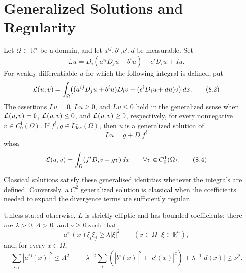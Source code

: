 \chapter{Generalized Solutions and Regularity}

\begin{definition}
\label{gt-def-8-divergence-form-generalized-solution}
Let $\Omega\subset\mathbb R^n$ be a domain, and let $a^{ij},b^i,c^i,d$ be
measurable. Set
\begin{equation}
Lu=D_i(a^{ij}D_j u+b^iu)+c^iD_i u+du.
\tag{8.1}
\end{equation}
For weakly differentiable $u$ for which the following integral is defined, put
\begin{equation}
\mathcal{L}(u,v)=\int_\Omega\bigl((a^{ij}D_j u+b^iu)D_i v
 -(c^iD_i u+du)v\bigr)\,dx.
\tag{8.2}
\end{equation}
The assertions $Lu=0$, $Lu\geq0$, and $Lu\leq0$ hold in the generalized sense
when $\mathcal{L}(u,v)=0$, $\mathcal{L}(u,v)\leq0$, and $\mathcal{L}(u,v)\geq0$, respectively, for
every nonnegative $v\in C_0^1(\Omega)$. If $f^i,g\in L^1_{\mathrm{loc}}(\Omega)$,
then $u$ is a generalized solution of
\begin{equation}
Lu=g+D_if^i
\tag{8.3}
\end{equation}
when
\begin{equation}
\mathcal{L}(u,v)=\int_\Omega(f^iD_iv-gv)\,dx
\qquad\forall v\in C_0^1(\Omega).
\tag{8.4}
\end{equation}
\end{definition}

\begin{remark}
\label{gt-rem-8-classical-generalized-equivalence}
Classical solutions satisfy these generalized identities whenever the integrals
are defined. Conversely, a $C^2$ generalized solution is classical when the
coefficients needed to expand the divergence terms are sufficiently regular.
\end{remark}

\begin{convention}
\label{gt-conv-8-ellipticity-coefficient-bounds}
Unless stated otherwise, $L$ is strictly elliptic and has bounded coefficients:
there are $\lambda>0$, $\Lambda>0$, and $\nu\geq0$ such that
\begin{equation}
a^{ij}(x)\xi_i\xi_j\geq\lambda|\xi|^2
\qquad(x\in\Omega,\ \xi\in\mathbb R^n),
\tag{8.5}
\end{equation}
and, for every $x\in\Omega$,
\begin{equation}
\sum_{i,j}|a^{ij}(x)|^2\leq\Lambda^2,
\qquad
\lambda^{-2}\sum_i(|b^i(x)|^2+|c^i(x)|^2)
 +\lambda^{-1}|d(x)|\leq\nu^2.
\tag{8.6}
\end{equation}
\end{convention}


